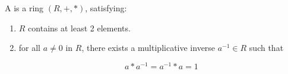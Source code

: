 \begin{definition}
    \label{DivisionRing}
    \leanok

    A  is a ring $(R, +, *)$, satisfying:

    \begin{enumerate}

    \item $R$ contains at least 2 elements.
    \item for all $a \neq 0$ in $R$, there exists a multiplicative inverse $a^{-1} \in R$ such that
    
    $$
    a * a^{-1} = a^{-1} * a = 1
    $$

    \end{enumerate}

\end{definition}






    





    

